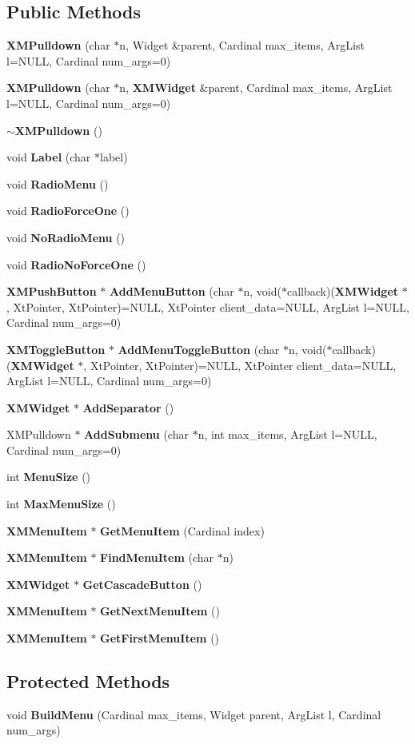 \subsection*{Public Methods}
\begin{CompactItemize}
\item 
{\bf XMPulldown} (char $\ast$n, Widget \&parent, Cardinal max\_\-items, Arg\-List l=NULL, Cardinal num\_\-args=0)
\item 
{\bf XMPulldown} (char $\ast$n, {\bf XMWidget} \&parent, Cardinal max\_\-items, Arg\-List l=NULL, Cardinal num\_\-args=0)
\item 
{\bf $\sim$XMPulldown} ()
\item 
void {\bf Label} (char $\ast$label)
\item 
void {\bf Radio\-Menu} ()
\item 
void {\bf Radio\-Force\-One} ()
\item 
void {\bf No\-Radio\-Menu} ()
\item 
void {\bf Radio\-No\-Force\-One} ()
\item 
{\bf XMPush\-Button} $\ast$ {\bf Add\-Menu\-Button} (char $\ast$n, void($\ast$callback)({\bf XMWidget} $\ast$, Xt\-Pointer, Xt\-Pointer)=NULL, Xt\-Pointer client\_\-data=NULL, Arg\-List l=NULL, Cardinal num\_\-args=0)
\item 
{\bf XMToggle\-Button} $\ast$ {\bf Add\-Menu\-Toggle\-Button} (char $\ast$n, void($\ast$callback)({\bf XMWidget} $\ast$, Xt\-Pointer, Xt\-Pointer)=NULL, Xt\-Pointer client\_\-data=NULL, Arg\-List l=NULL, Cardinal num\_\-args=0)
\item 
{\bf XMWidget} $\ast$ {\bf Add\-Separator} ()
\item 
XMPulldown $\ast$ {\bf Add\-Submenu} (char $\ast$n, int max\_\-items, Arg\-List l=NULL, Cardinal num\_\-args=0)
\item 
int {\bf Menu\-Size} ()
\item 
int {\bf Max\-Menu\-Size} ()
\item 
{\bf XMMenu\-Item} $\ast$ {\bf Get\-Menu\-Item} (Cardinal index)
\item 
{\bf XMMenu\-Item} $\ast$ {\bf Find\-Menu\-Item} (char $\ast$n)
\item 
{\bf XMWidget} $\ast$ {\bf Get\-Cascade\-Button} ()
\item 
{\bf XMMenu\-Item} $\ast$ {\bf Get\-Next\-Menu\-Item} ()
\item 
{\bf XMMenu\-Item} $\ast$ {\bf Get\-First\-Menu\-Item} ()
\end{CompactItemize}
\subsection*{Protected Methods}
\begin{CompactItemize}
\item 
void {\bf Build\-Menu} (Cardinal max\_\-items, Widget parent, Arg\-List l, Cardinal num\_\-args)
\end{CompactItemize}
